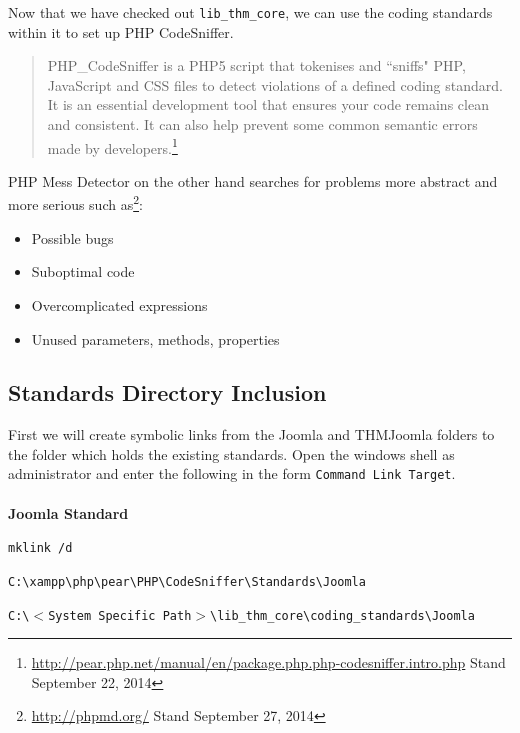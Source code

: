 \documentclass[]{report}
\begin{document}
Now that we have checked out \texttt{lib\_thm\_core}, we can use the coding standards within it to set up PHP CodeSniffer.

\begin{quote}
	PHP\_CodeSniffer is a PHP5 script that tokenises and ``sniffs" PHP, JavaScript and CSS files to detect violations of a defined coding standard. It is an essential development tool that ensures your code remains clean and consistent. It can also help prevent some common semantic errors made by developers.\footnote{\url{http://pear.php.net/manual/en/package.php.php-codesniffer.intro.php} Stand September 22, 2014}
\end{quote}

\noindent
PHP Mess Detector on the other hand searches for problems more abstract and more serious such as\footnote{\url{http://phpmd.org/} Stand September 27, 2014}:

\begin{itemize}
	\item Possible bugs
	\item Suboptimal code
	\item Overcomplicated expressions
	\item Unused parameters, methods, properties
\end{itemize}

\subsection{Standards Directory Inclusion}

First we will create symbolic links from the Joomla and THMJoomla folders to the folder which holds the existing standards. Open the windows shell as administrator and enter the following in the form \texttt{Command Link Target}.\\
\\
\textbf{Joomla Standard}
\begin{description}
	\itemsep-10pt
	\item[Command] \texttt{mklink /d}\\
	\item[Link] \texttt{C:\textbackslash xampp\textbackslash php\textbackslash pear\textbackslash PHP\textbackslash CodeSniffer\textbackslash Standards\textbackslash Joomla}\\
	\item[Target] \texttt{C:\textbackslash $<$System Specific Path$>$\textbackslash lib\_thm\_core\textbackslash coding\_standards\textbackslash Joomla}\\
\end{description}
\end{document}
